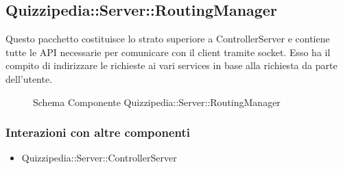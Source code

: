 \subsection{Quizzipedia::Server::RoutingManager}
Questo pacchetto costituisce lo strato superiore a ControllerServer e contiene tutte le API necessarie per comunicare con il client tramite socket. Esso ha il compito di indirizzare le richieste ai vari services in base alla richiesta da parte dell'utente.
\begin{figure}[H]
\centering
\noindent{}
\caption[Schema Componente Quizzipedia::Server::RoutingManager]{Schema Componente Quizzipedia::Server::RoutingManager}
\end{figure}
\subsubsection{Interazioni con altre componenti}
\begin{itemize}
\item Quizzipedia::Server::ControllerServer
\end{itemize}

